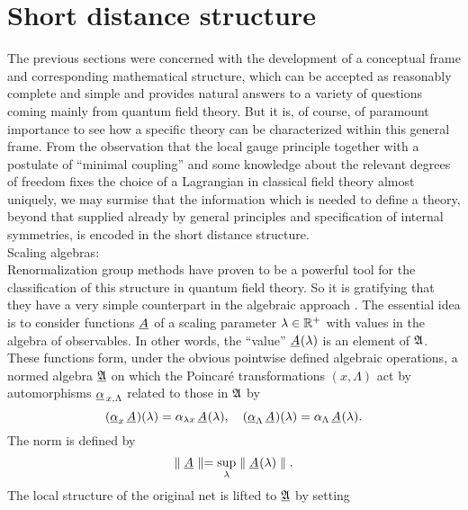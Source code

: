 \section{Short distance structure}
\setcounter{equation}{0}
The previous sections were concerned with the development of a
conceptual frame and corresponding mathematical structure, which can
be accepted as reasonably complete and simple and provides natural
answers to a variety of questions coming mainly from quantum field
theory. But it is, of course, of paramount importance to see how a
specific theory can be characterized within this general frame. {}From
the observation that the local gauge principle together with a
postulate of ``minimal coupling'' and some knowledge about the
relevant degrees of freedom fixes the choice of a Lagrangian in
classical field theory almost uniquely, we may surmise that the
information which is needed to define a theory, beyond that supplied
already by general principles and specification of internal
symmetries, is encoded in the short distance structure.\\[2mm]
{\noindent \subsect Scaling algebras:}\\[2mm]
Renormalization group methods have proven to be a powerful tool for
the classification of this structure in quantum field theory. So it is
gratifying that they have a very simple counterpart in the algebraic
approach \cite{BuVe}. The essential idea is to consider functions ${\underline{A}_{}}$ of
a scaling parameter $\lambda \in {\Bbb R}^+$ with values in the
algebra of observables. In other words, the ``value'' ${\underline{A}_{}}(\lambda)$ is
an element of ${\mathfrak A}$. These functions form, under the obvious
pointwise defined algebraic operations, a normed algebra
$\underline{{\mathfrak A}}$ on which the Poincar\'e transformations
$(x,\Lambda)$ act by automorphisms 
$\underline{\alpha}_{\, x,\Lambda}$ related to those in ${\mathfrak A}$ by
\begin{equation}
( \underline{\alpha}_x \, {\underline{A}_{}} )(\lambda) = 
\alpha_{\lambda x} \, {\underline{A}_{}}(\lambda) , \quad
( \underline{\alpha}_\Lambda \, {\underline{A}_{}} )(\lambda)= 
\alpha_\Lambda \, {\underline{A}_{}} (\lambda).
\end{equation}
The norm is defined by
\begin{equation}
\parallel {\underline{A}_{}} \parallel = \sup_\lambda \parallel {\underline{A}_{}}(\lambda) \parallel.
\end{equation}
The local structure of the original net is lifted to $\underline{{\mathfrak A}}$ by setting
